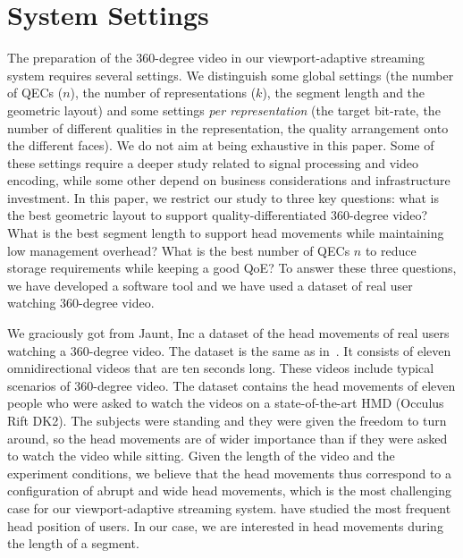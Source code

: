 \newcommand\testBitrateBudget{7}
\section{System Settings}
\label{sec:settings}

The preparation of the 360-degree video in our viewport-adaptive streaming system
requires several settings. We distinguish some global settings (the number of \acp{QEC} ($n$),
the number of representations ($k$), the segment length and the geometric layout)
and some settings \emph{per representation}
(the target bit-rate, the number of different qualities in the representation, the quality
arrangement onto the different
faces). We do not aim
at being exhaustive in this paper. Some of these settings require a deeper study related to
signal processing and video encoding, while some other depend on business considerations and infrastructure investment. In this paper, we restrict our study
to three key questions: what is the best geometric layout to support quality-differentiated 360-degree
video? What is the best segment length to support head movements while maintaining low
management overhead? What is the best number of \acp{QEC} $n$ to reduce storage requirements while keeping a good \ac{QoE}? To answer these three questions,
we have developed a software tool and we have used a dataset of real user watching 360-degree
video.


We graciously got from Jaunt, Inc a dataset of the head movements
of real users watching a 360-degree video. The dataset is the same as
in~\cite{yu_framework_2015}. It consists of
eleven omnidirectional videos that are ten seconds long. These videos include
typical scenarios of 360-degree video. The dataset contains
the head movements of eleven people who were asked to watch the videos on
a state-of-the-art \ac{HMD} (Occulus Rift DK2). The subjects were
standing and they were given the freedom to turn around, so the head
movements are of wider importance than if they were asked to watch the
video while sitting. Given the length of the video and the experiment
conditions, we believe that the head movements thus correspond to a
configuration of abrupt and wide head movements, which is the most
challenging case for our viewport-adaptive streaming system.
\citet{yu_framework_2015} have studied the most frequent head position of users.
In our case, we are interested in head movements during the
length of a segment.

